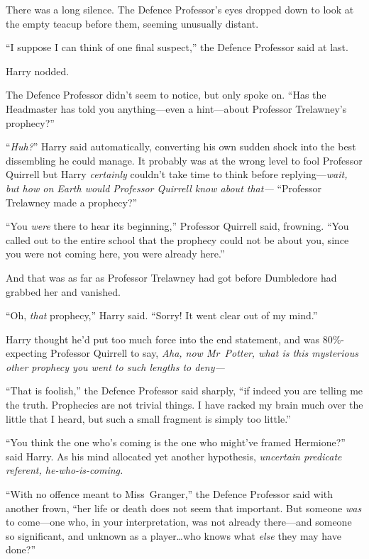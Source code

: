 There was a long silence. The Defence Professor’s eyes dropped down to look at the empty teacup before them, seeming unusually distant.

“I suppose I can think of one final suspect,” the Defence Professor said at last.

Harry nodded.

The Defence Professor didn’t seem to notice, but only spoke on. “Has the Headmaster has told you anything—even a hint—about Professor Trelawney’s prophecy?”

“\emph{Huh?}” Harry said automatically, converting his own sudden shock into the best dissembling he could manage. It probably was at the wrong level to fool Professor Quirrell but Harry \emph{certainly} couldn’t take time to think before replying—\emph{wait, but how on Earth would Professor Quirrell know about \emph{that}—} “Professor Trelawney made a prophecy?”

“You \emph{were} there to hear its beginning,” Professor Quirrell said, frowning. “You called out to the entire school that the prophecy could not be about you, since you were not coming here, you were already here.”


And that was as far as Professor Trelawney had got before Dumbledore had grabbed her and vanished.

“Oh, \emph{that} prophecy,” Harry said. “Sorry! It went clear out of my mind.”

Harry thought he’d put too much force into the end statement, and was 80\%-expecting Professor Quirrell to say, \emph{Aha, now Mr~Potter, what is this mysterious \emph{other} prophecy you went to such lengths to deny—}

“That is foolish,” the Defence Professor said sharply, “if indeed you are telling me the truth. Prophecies are not trivial things. I have racked my brain much over the little that I heard, but such a small fragment is simply too little.”

“You think the one who’s coming is the one who might’ve framed Hermione?” said Harry. As his mind allocated yet another hypothesis, \emph{uncertain predicate referent, he-who-is-coming.}

“With no offence meant to Miss~Granger,” the Defence Professor said with another frown, “her life or death does not seem that important. But someone \emph{was} to come—one who, in your interpretation, was not already there—and someone so significant, and unknown as a player…who knows what \emph{else} they may have done?”

